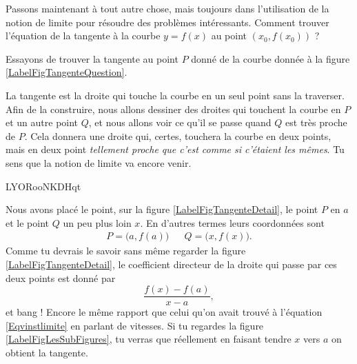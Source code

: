 Passons maintenant à tout autre chose, mais toujours dans l'utilisation de la notion de limite pour résoudre des problèmes intéressants. Comment trouver l'équation de la tangente à la courbe $y=f(x)$ au point $(x_0,f(x_0))$ ?

Essayons de trouver la tangente au point $P$ donné de la courbe donnée à la figure \ref{LabelFigTangenteQuestion}.

\newcommand{\CaptionFigTangenteQuestion}{Comment trouver la tangente à la courbe au point $P$ ?}


La tangente est la droite qui touche la courbe en un seul point sans la traverser. Afin de la construire, nous allons dessiner des droites qui touchent la courbe en $P$ et un autre point $Q$, et nous allons voir ce qu'il se passe quand $Q$ est très proche de $P$. Cela donnera une droite qui, certes, touchera la courbe en deux points, mais en deux point \emph{tellement proche que c'est comme si c'étaient les mêmes}. Tu sens que la notion de limite va encore venir.


\newcommand{\CaptionFigTangenteDetail}{Traçons d'abord une corde entre le point $P$ et un point $Q$ un peu plus loin.}



LYORooNKDHqt


Nous avons placé le point, sur la figure \ref{LabelFigTangenteDetail}, le point $P$ en $a$ et le point $Q$ un peu plus loin $x$. En d'autres termes leurs coordonnées sont
\begin{align}
	P=\big(a,f(a)\big)&& Q=\big(x,f(x)\big).
\end{align}
Comme tu devrais le savoir sans même regarder la figure \ref{LabelFigTangenteDetail}, le coefficient directeur de la droite qui passe par ces deux points est donné par
\begin{equation}
	\frac{ f(x)-f(a) }{ x-a },
\end{equation}
et bang ! Encore le même rapport que celui qu'on avait trouvé à l'équation \eqref{Eqvinstlimite} en parlant de vitesses. Si tu regardes la figure \ref{LabelFigLesSubFigures}, tu verras que réellement en faisant tendre $x$ vers $a$ on obtient la tangente.

\newcommand{\CaptionFigLesSubFigures}{Recherche de la tangente par approximations successives.}


